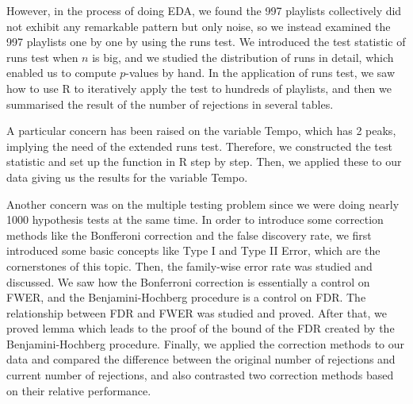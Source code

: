 \documentclass[12pt]{article}
\theoremstyle{plain}
\theoremstyle{definition}
\theoremstyle{remark}
\begin{document}
However, in the process of doing EDA, we found the 997 playlists collectively did not exhibit any remarkable pattern but only noise, so we instead examined the 997 playlists one by one by using the runs test. We introduced the test statistic of runs test when $n$ is big, and we studied the distribution of runs in detail, which enabled us to compute $p$-values by hand. In the application of runs test, we saw how to use R to iteratively apply the test to hundreds of playlists, and then we summarised the result of the number of rejections in several tables. 

A particular concern has been raised on the variable Tempo, which has 2 peaks, implying the need of the extended runs test. Therefore, we constructed the test statistic and set up the function in R step by step. Then, we applied these to our data giving us the results for the variable Tempo.

Another concern was on the multiple testing problem since we were doing nearly 1000 hypothesis tests at the same time. In order to introduce some correction methods like the Bonfferoni correction and the false discovery rate, we first introduced some basic concepts like Type I and Type II Error, which are the cornerstones of this topic. Then, the family-wise error rate was studied and discussed. We saw how the Bonferroni correction is essentially a control on FWER, and the Benjamini-Hochberg procedure is a control on FDR. The relationship between FDR and FWER was studied and proved. After that, we proved lemma which leads to the proof of the bound of the FDR created by the Benjamini-Hochberg procedure. Finally, we applied the correction methods to our data and compared the difference between the original number of rejections and current number of rejections, and also contrasted two correction methods based on their relative performance.
\end{document}

